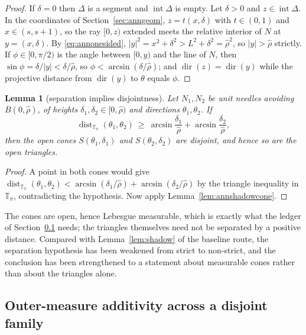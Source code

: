 \documentclass[11pt]{article}
\theoremstyle{plain}
\newtheorem{lemma}[theorem]{Lemma}
\theoremstyle{definition}
\theoremstyle{remark}
\newcommand{\Tp}{\mathbb{T}_{\pi}}
\begin{document}
\begin{proof}
If $\delta=0$ then $\Delta$ is a segment and $\operatorname{int}\Delta$ is
empty. Let $\delta>0$ and $z\in\operatorname{int}\Delta$. In the coordinates of
Section~\ref{sec:anngeom}, $z=t(x,\delta)$ with $t\in(0,1)$ and
$x\in(s,s+1)$, so the ray $[0,z)$ extended meets the relative interior of $N$
at $y=(x,\delta)$. By \eqref{eq:annonesided},
$|y|^{2}=x^{2}+\delta^{2}>L^{2}+\delta^{2}=\hat\rho^{2}$, so $|y|>\hat\rho$
strictly. If $\phi\in[0,\pi/2)$ is the angle between $[0,y)$ and the line of
$N$, then $\sin\phi=\delta/|y|<\delta/\hat\rho$, so
$\phi<\arcsin(\delta/\hat\rho)$; and $\operatorname{dir}(z)=\operatorname{dir}(y)$
while the projective distance from $\operatorname{dir}(y)$ to $\theta$ equals
$\phi$.
\end{proof}

\begin{lemma}[separation implies disjointness]\label{lem:annconedisjoint}
Let $N_{1},N_{2}$ be unit needles avoiding $B(0,\hat\rho)$, of heights
$\delta_{1},\delta_{2}\in[0,\hat\rho)$ and directions $\theta_{1},\theta_{2}$.
If
\[
  \operatorname{dist}_{\Tp}(\theta_{1},\theta_{2})
  \ \ge\ \arcsin\frac{\delta_{1}}{\hat\rho}+\arcsin\frac{\delta_{2}}{\hat\rho},
\]
then the open cones $S(\theta_{1},\delta_{1})$ and $S(\theta_{2},\delta_{2})$
are disjoint, and hence so are the open triangles.
\end{lemma}

\begin{proof}
A point in both cones would give
$\operatorname{dist}_{\Tp}(\theta_{1},\theta_{2})
<\arcsin(\delta_{1}/\hat\rho)+\arcsin(\delta_{2}/\hat\rho)$ by the triangle
inequality in $\Tp$, contradicting the hypothesis. Now apply
Lemma~\ref{lem:annshadowcone}.
\end{proof}

The cones are open, hence Lebesgue measurable, which is exactly what the ledger
of Section~\ref{sec:annledger} needs; the triangles themselves need not be
separated by a positive distance. Compared with Lemma~\ref{lem:shadow} of the
baseline route, the separation hypothesis has been weakened from strict to
non-strict, and the conclusion has been strengthened to a statement about
measurable cones rather than about the triangles alone.

\subsection{Outer-measure additivity across a disjoint family}\label{sec:annledger}
\end{document}
